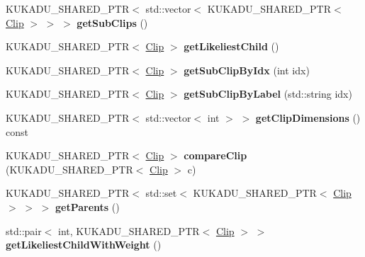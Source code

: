 \begin{DoxyCompactItemize}
\item 
K\+U\+K\+A\+D\+U\+\_\+\+S\+H\+A\+R\+E\+D\+\_\+\+P\+TR$<$ std\+::vector$<$ K\+U\+K\+A\+D\+U\+\_\+\+S\+H\+A\+R\+E\+D\+\_\+\+P\+TR$<$ \hyperlink{classkukadu_1_1Clip}{Clip} $>$ $>$ $>$ {\bfseries get\+Sub\+Clips} ()\hypertarget{classkukadu_1_1Clip_acdfec2bfb4968418b9b24696af6b07a6}{}\label{classkukadu_1_1Clip_acdfec2bfb4968418b9b24696af6b07a6}

\item 
K\+U\+K\+A\+D\+U\+\_\+\+S\+H\+A\+R\+E\+D\+\_\+\+P\+TR$<$ \hyperlink{classkukadu_1_1Clip}{Clip} $>$ {\bfseries get\+Likeliest\+Child} ()\hypertarget{classkukadu_1_1Clip_ab6089133084f49019e2fd6e6373c67e8}{}\label{classkukadu_1_1Clip_ab6089133084f49019e2fd6e6373c67e8}

\item 
K\+U\+K\+A\+D\+U\+\_\+\+S\+H\+A\+R\+E\+D\+\_\+\+P\+TR$<$ \hyperlink{classkukadu_1_1Clip}{Clip} $>$ {\bfseries get\+Sub\+Clip\+By\+Idx} (int idx)\hypertarget{classkukadu_1_1Clip_a97677251b01b02c3b4800d04ca6ad07e}{}\label{classkukadu_1_1Clip_a97677251b01b02c3b4800d04ca6ad07e}

\item 
K\+U\+K\+A\+D\+U\+\_\+\+S\+H\+A\+R\+E\+D\+\_\+\+P\+TR$<$ \hyperlink{classkukadu_1_1Clip}{Clip} $>$ {\bfseries get\+Sub\+Clip\+By\+Label} (std\+::string idx)\hypertarget{classkukadu_1_1Clip_af046e5a1afee00613e11fcb2e48d28fc}{}\label{classkukadu_1_1Clip_af046e5a1afee00613e11fcb2e48d28fc}

\item 
K\+U\+K\+A\+D\+U\+\_\+\+S\+H\+A\+R\+E\+D\+\_\+\+P\+TR$<$ std\+::vector$<$ int $>$ $>$ {\bfseries get\+Clip\+Dimensions} () const \hypertarget{classkukadu_1_1Clip_ad68e8835167a1bd4197819891f3114e5}{}\label{classkukadu_1_1Clip_ad68e8835167a1bd4197819891f3114e5}

\item 
K\+U\+K\+A\+D\+U\+\_\+\+S\+H\+A\+R\+E\+D\+\_\+\+P\+TR$<$ \hyperlink{classkukadu_1_1Clip}{Clip} $>$ {\bfseries compare\+Clip} (K\+U\+K\+A\+D\+U\+\_\+\+S\+H\+A\+R\+E\+D\+\_\+\+P\+TR$<$ \hyperlink{classkukadu_1_1Clip}{Clip} $>$ c)\hypertarget{classkukadu_1_1Clip_a31c64a7290c936dc63b48b47ba563297}{}\label{classkukadu_1_1Clip_a31c64a7290c936dc63b48b47ba563297}

\item 
K\+U\+K\+A\+D\+U\+\_\+\+S\+H\+A\+R\+E\+D\+\_\+\+P\+TR$<$ std\+::set$<$ K\+U\+K\+A\+D\+U\+\_\+\+S\+H\+A\+R\+E\+D\+\_\+\+P\+TR$<$ \hyperlink{classkukadu_1_1Clip}{Clip} $>$ $>$ $>$ {\bfseries get\+Parents} ()\hypertarget{classkukadu_1_1Clip_aac76795ec89a39adb9b02a7b87f27cb9}{}\label{classkukadu_1_1Clip_aac76795ec89a39adb9b02a7b87f27cb9}

\item 
std\+::pair$<$ int, K\+U\+K\+A\+D\+U\+\_\+\+S\+H\+A\+R\+E\+D\+\_\+\+P\+TR$<$ \hyperlink{classkukadu_1_1Clip}{Clip} $>$ $>$ {\bfseries get\+Likeliest\+Child\+With\+Weight} ()\hypertarget{classkukadu_1_1Clip_a098f83c1065fc34d5952cc1a6b66a5e2}{}\label{classkukadu_1_1Clip_a098f83c1065fc34d5952cc1a6b66a5e2}

\end{DoxyCompactItemize}
